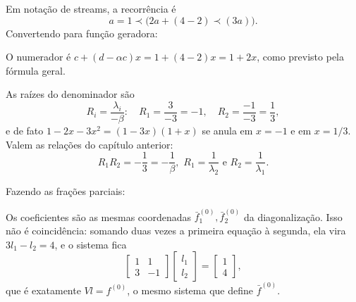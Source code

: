 Em notação de streams, a recorrência é
\[
  a = 1 \prec \big( 2a + (4 - 2) \prec (3a) \big).
\]
Convertendo para função geradora:
\begin{calcproof}[.]
\end{calcproof}
O numerador é $c + (d - \alpha c)x = 1 + (4 - 2)x = 1 + 2x$, como previsto pela fórmula geral.

As raízes do denominador são
\[
  R_i = \dfrac{\lambda_i}{-\beta}:
  \quad
  R_1 = \dfrac{3}{-3} = -1,
  \quad
  R_2 = \dfrac{-1}{-3} = \dfrac{1}{3},
\]
e de fato $1 - 2x - 3x^2 = (1 - 3x)(1 + x)$ se anula em $x = -1$ e em $x = 1/3$. Valem as relações do capítulo anterior:
\[
  R_1 R_2 = -\dfrac{1}{3} = -\dfrac{1}{\beta}, \,\, R_1 = \dfrac{1}{\lambda_2} \,\, \text{e} \,\, R_2 = \dfrac{1}{\lambda_1}.
\]

Fazendo as frações parciais:
\begin{calcproof}[.]
\end{calcproof}

Os coeficientes são as mesmas coordenadas $\bar{f}^{(0)}_1, \bar{f}^{(0)}_2$ da diagonalização. Isso não é coincidência: somando duas vezes a primeira equação à segunda, ela vira $3 l_1 - l_2 = 4$, e o sistema fica
\[
  \begin{bmatrix}
    1 & 1 \\
    3 & -1
  \end{bmatrix}
  \begin{bmatrix}
    l_1 \\
    l_2
  \end{bmatrix}
  =
  \begin{bmatrix}
    1 \\
    4
  \end{bmatrix},
\]
que é exatamente $V l = f^{(0)}$, o mesmo sistema que define $\bar{f}^{(0)}$.

